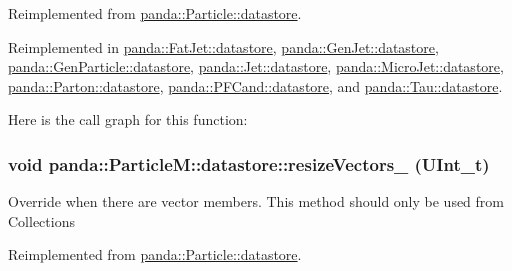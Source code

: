 Reimplemented from \hyperlink{structpanda_1_1Particle_1_1datastore_a9fa2653f0e8b59a5cbc752beaf6b7a57}{panda::Particle::datastore}.

Reimplemented in \hyperlink{structpanda_1_1FatJet_1_1datastore_a8dd1a45fedb7d5ec627601b23f0dc2d5}{panda::FatJet::datastore}, \hyperlink{structpanda_1_1GenJet_1_1datastore_aea7b516e513fbdf5cc2c6f67d0ae3dba}{panda::GenJet::datastore}, \hyperlink{structpanda_1_1GenParticle_1_1datastore_a7c4f6ca82174720a87fa2371f40000d7}{panda::GenParticle::datastore}, \hyperlink{structpanda_1_1Jet_1_1datastore_ae6ac289071c894912c7a60cdd224509f}{panda::Jet::datastore}, \hyperlink{structpanda_1_1MicroJet_1_1datastore_a9722ed3783e57fb5e55307d72ebddb15}{panda::MicroJet::datastore}, \hyperlink{structpanda_1_1Parton_1_1datastore_affc6fef2d7648b73182dbb91d5043b36}{panda::Parton::datastore}, \hyperlink{structpanda_1_1PFCand_1_1datastore_a9fc7ec497f046c098b89eb04ee508174}{panda::PFCand::datastore}, and \hyperlink{structpanda_1_1Tau_1_1datastore_ad3b1c3b063d8091225a37315a6dfb998}{panda::Tau::datastore}.

Here is the call graph for this function:\hypertarget{structpanda_1_1ParticleM_1_1datastore_a6dd61d4a8f70e81a1638757a5edbc7ed}{
\subsubsection[{resizeVectors\_\-}]{\setlength{\rightskip}{0pt plus 5cm}void panda::ParticleM::datastore::resizeVectors\_\- (UInt\_\-t)}}
\label{structpanda_1_1ParticleM_1_1datastore_a6dd61d4a8f70e81a1638757a5edbc7ed}


Override when there are vector members. This method should only be used from Collections 

Reimplemented from \hyperlink{structpanda_1_1Particle_1_1datastore_aef7e06dbd8399f7de3215aa895907c5f}{panda::Particle::datastore}.

